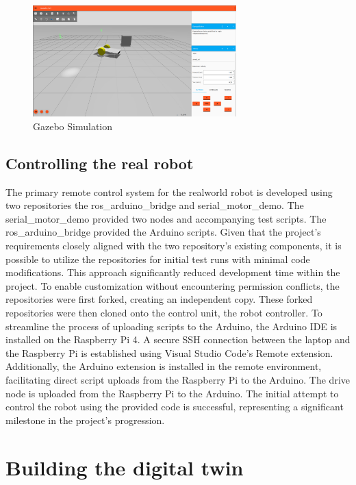 \begin{figure}[h]
    \centering
    \includegraphics[width=0.7\textwidth]{Figures/gazebo_simulation.png}
    \caption{Gazebo Simulation}
    \label{fig:gazebo}

\end{figure}

\subsection{Controlling the real robot}

The primary remote control system for the real\-world robot is developed using two repositories the ros\_arduino\_bridge and serial\_motor\_demo. The serial\_motor\_demo provided two nodes and accompanying test scripts. The ros\_arduino\_bridge provided the Arduino scripts. Given that the project's requirements closely aligned with the two repository's existing components, it is possible to utilize the repositories for initial test runs with minimal code modifications. This approach significantly reduced development time within the project.
To enable customization without encountering permission conflicts, the repositories were first forked, creating an independent copy. These forked repositories were then cloned onto the control unit, the robot controller. To streamline the process of uploading scripts to the Arduino, the Arduino IDE is installed on the Raspberry Pi 4. A secure SSH connection between the laptop and the Raspberry Pi is established using Visual Studio Code's Remote extension. Additionally, the Arduino extension is installed in the remote environment, facilitating direct script uploads from the Raspberry Pi to the Arduino. The drive node is uploaded from the Raspberry Pi to the Arduino. The initial attempt to control the robot using the provided code is successful, representing a significant milestone in the project's progression.

\section{Building the digital twin}

